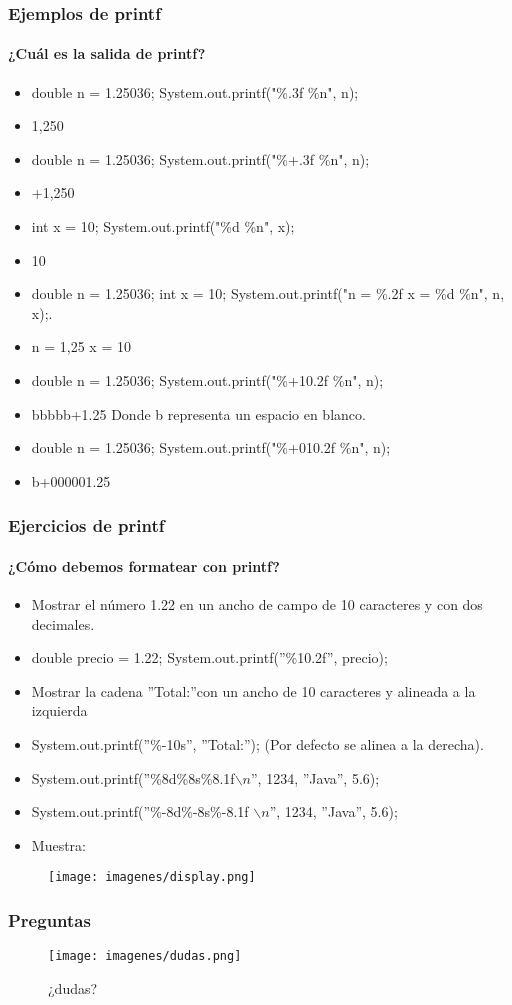 \documentclass{beamer}
\begin{document}
\begin{frame}[fragile]
\frametitle{Ejemplos de printf}
\framesubtitle{¿Cuál es la salida de printf?}
\begin{itemize}[<+->]
\item double n = 1.25036; System.out.printf("\%.3f \%n", n);
\item \alert{1,250}
\item double n = 1.25036; System.out.printf("\%+.3f \%n", n);
\item \alert{+1,250}
\item int x = 10; System.out.printf("\%d \%n", x);
\item \alert{10}
\item double n = 1.25036; int x = 10; System.out.printf("n = \%.2f x = \%d \%n", n, x);.
\item \alert{n = 1,25 x = 10}
\item double n = 1.25036; System.out.printf("\%+10.2f \%n", n);
\item \alert{bbbbb+1.25} Donde b representa un espacio en blanco.
\item double n = 1.25036; System.out.printf("\%+010.2f \%n", n);
\item \alert{b+000001.25}
\end{itemize}
\pause
\end{frame}

\begin{frame}[fragile]
\frametitle{Ejercicios de printf}
\framesubtitle{¿Cómo debemos formatear con printf?}
\begin{itemize}[<+->]
\item Mostrar el número 1.22 en un ancho de campo de 10 caracteres y con dos decimales.
\item \alert{double precio = 1.22; System.out.printf(''\%10.2f'', precio);}
\item Mostrar la cadena ''Total:''con un ancho de 10 caracteres y alineada a la izquierda
\item \alert{System.out.printf(''\%-10s'', ''Total:'');} (Por defecto se alinea a la derecha).
\item System.out.printf(''\%8d\%8s\%8.1f$\backslash n$'', 1234, ''Java'', 5.6);
\item System.out.printf(''\%-8d\%-8s\%-8.1f $\backslash n$'', 1234, ''Java'', 5.6);
\item Muestra:
\end{itemize}
\pause
\begin{figure}
\texttt{[image: imagenes/display.png]}
\end{figure}
\end{frame}


\begin{frame}
\frametitle{Preguntas} 
\begin{figure}
\texttt{[image: imagenes/dudas.png]} 
\caption{¿dudas?}
\end{figure} 
\end{frame}
\end{document}
